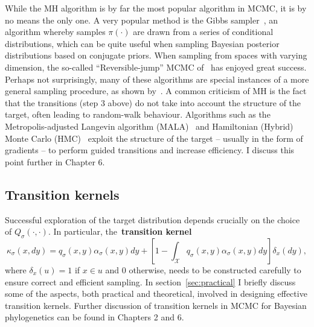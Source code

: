 While the MH algorithm is by far the most popular algorithm in MCMC, it is by no means the only one.
A very popular method is the Gibbs sampler~\citep{Geman1984}, an algorithm whereby samples $\pi(\cdot)$ are drawn from a series of conditional distributions, which can be quite useful when sampling Bayesian posterior distributions based on conjugate priors.
When sampling from spaces with varying dimension, the so-called ``Reversible-jump'' MCMC of~\cite{Green1995} has enjoyed great success.
Perhaps not surprisingly, many of these algorithms are special instances of a more general sampling procedure, as shown by~\cite{Keith2004}.
A common criticism of MH is the fact that the transitions (step 3 above) do not take into account the structure of the target, often leading to random-walk behaviour.
Algorithms such as the Metropolis-adjusted Langevin algorithm (MALA)~\citep{Roberts1998} and Hamiltonian (Hybrid) Monte Carlo (HMC)~\citep{Duane1987,Neal2011} exploit the structure of the target -- usually in the form of gradients -- to perform guided transitions and increase efficiency.
I discuss this point further in Chapter 6.

\subsection{Transition kernels}
\label{sec:kernels}

Successful exploration of the target distribution depends crucially on the choice of $Q_\sigma(\cdot, \cdot)$.
In particular, the~\textbf{transition kernel}
\begin{equation}
 \label{eq:transition_kernel}
 \kappa_\sigma(x, dy) = q_\sigma(x, y) \alpha_\sigma(x,y)dy  + \left[1 - \int_{\mathcal{X}} q_\sigma(x, y) \alpha_\sigma(x,y)dy \right]\delta_x(dy),
\end{equation}
where $\delta_x(u) = 1$ if $x \in u$ and $0$ otherwise, needs to be constructed carefully to ensure correct and efficient sampling.
In section~\ref{sec:practical} I briefly discuss some of the aspects, both practical and theoretical, involved in designing effective transition kernels.
Further discussion of transition kernels in MCMC for Bayesian phylogenetics can be found in Chapters 2 and 6.

